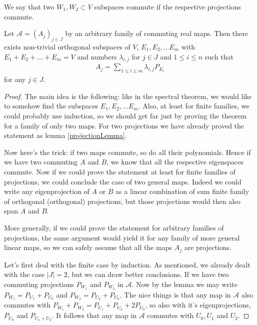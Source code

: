 \begin{maar}
	We say that two $W_{1}, W_{2} \subset V$ subspaces commute if the respective projections commute.
\end{maar}

\begin{lause}\label{commuting_real_maps}
	Let $\mathcal{A} = (A_{j})_{j \in J}$ by an arbitrary family of commuting real maps. Then there exists non-trivial orthogonal subspaces of $V$, $E_{1}, E_{2}, \ldots E_{m}$ with $E_{1} + E_{2} + \ldots + E_{m} = V$ and numbers $\lambda_{i, j}$ for $j \in J$ and $1 \leq i \leq n$ such that
	\begin{align*}
		A_{j} = \sum_{1 \leq i \leq m} \lambda_{i, j} P_{E_{i}}
	\end{align*}
	for any $j \in J$.
\end{lause}
\begin{proof}
	The main idea is the following: like in the spectral theorem, we would like to somehow find the subspaces $E_{1}, E_{2}, \ldots E_{m}$. Also, at least for finite families, we could probably use induction, so we should get far just by proving the theorem for a family of only two maps. For two projections we have already proved the statement as lemma \ref{projectionLemma}.

	Now here's the trick: if two maps commute, so do all their polynomials. Hence if we have two commuting $A$ and $B$, we know that all the respective eigenspaces commute. Now if we could prove the statement at least for finite families of projections, we could conclude the case of two general maps. Indeed we could write any eigenprojection of $A$ or $B$ as a linear combination of sum finite family of orthogonal (orthogonal) projections, but those projections would then also span $A$ and $B$.

	More generally, if we could prove the statement for arbitrary families of projections, the same argument would yield it for any family of more general linear maps, so we can safely assume that all the maps $A_{j}$ are projections.

	Let's first deal with the finite case by induction. As mentioned, we already dealt with the case $|J| = 2$, but we can draw better conclusions. If we have two commuting projections $P_{W_{1}}$ and $P_{W_{2}}$ in $\mathcal{A}$. Now by the lemma we may write $P_{W_{1}} = P_{U_{1}} + P_{U_{0}}$ and $P_{W_{2}} = P_{U_{2}} + P_{U_{0}}$. The nice things is that any map in $\mathcal{A}$ also commutes with $P_{W_{1}} + P_{W_{2}} = P_{U_{1}} + P_{U_{2}} + 2 P_{U_{0}}$, so also with it's eigenprojections, $P_{U_{0}}$ and $P_{U_{1} + U_{2}}$. It follows that any map in $\mathcal{A}$ commutes with $U_{0}, U_{1}$ and $U_{2}$.


\end{proof}
